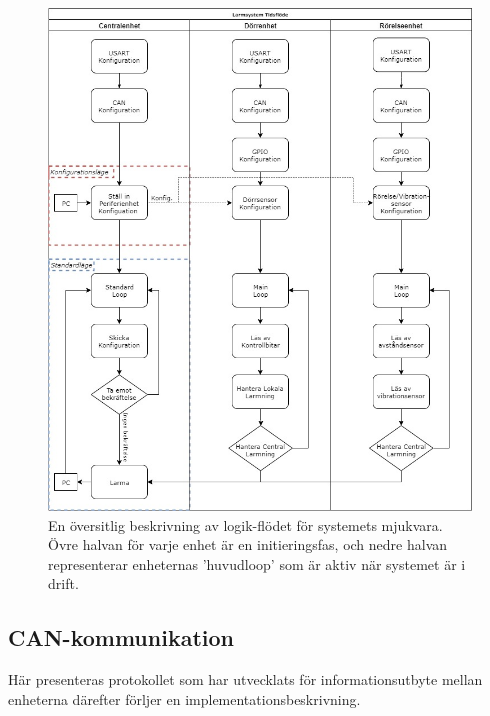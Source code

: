 \documentclass{article}
\begin{document}
\begin{figure}[H]
    \centering
    \includegraphics[width=1\textwidth]{figurer/TidsFlode.jpg}
    \caption{En översitlig beskrivning av logik-flödet för systemets mjukvara. Övre halvan för varje enhet är en initieringsfas,
    och nedre halvan representerar enheternas 'huvudloop' som är aktiv när systemet är i drift.}
    \label{fig:tidsflöde}
\end{figure}

\subsection{CAN-kommunikation}
\label{can}
Här presenteras protokollet som har utvecklats för informationsutbyte mellan enheterna därefter förljer en implementationsbeskrivning.
\end{document}
